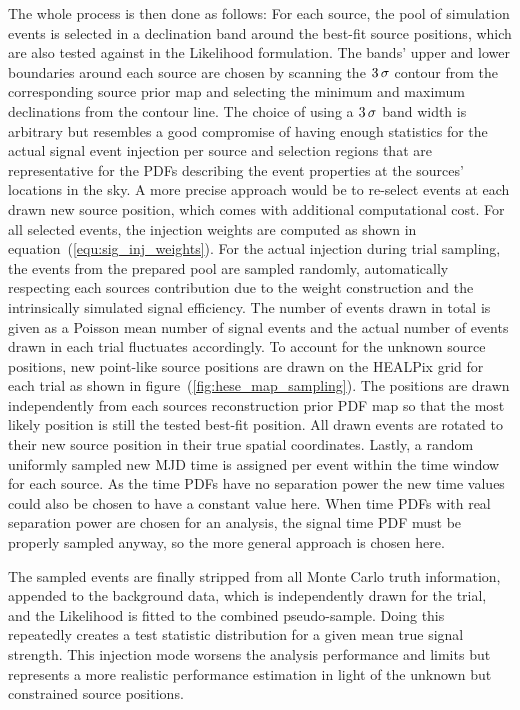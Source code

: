 The whole process is then done as follows:
For each source, the pool of simulation events is selected in a declination band around the best-fit source positions, which are also tested against in the Likelihood formulation.
The bands' upper and lower boundaries around each source are chosen by scanning the $\num{3}\,\sigma$ contour from the corresponding source prior map and selecting the minimum and maximum declinations from the contour line.
The choice of using a $\num{3}\,\sigma$ band width is arbitrary but resembles a good compromise of having enough statistics for the actual signal event injection per source and selection regions that are representative for the PDFs describing the event properties at the sources' locations in the sky.
A more precise approach would be to re-select events at each drawn new source position, which comes with additional computational cost.
For all selected events, the injection weights are computed as shown in equation~(\ref{equ:sig_inj_weights}).
For the actual injection during trial sampling, the events from the prepared pool are sampled randomly, automatically respecting each sources contribution due to the weight construction and the intrinsically simulated signal efficiency.
The number of events drawn in total is given as a Poisson mean number of signal events and the actual number of events drawn in each trial fluctuates accordingly.
To account for the unknown source positions, new point-like source positions are drawn on the HEALPix grid for each trial as shown in figure~(\ref{fig:hese_map_sampling}).
The positions are drawn independently from each sources reconstruction prior PDF map so that the most likely position is still the tested best-fit position.
All drawn events are rotated to their new source position in their true spatial coordinates.
Lastly, a random uniformly sampled new MJD time is assigned per event within the time window for each source.
As the time PDFs have no separation power the new time values could also be chosen to have a constant value here.
When time PDFs with real separation power are chosen for an analysis, the signal time PDF must be properly sampled anyway, so the more general approach is chosen here.

The sampled events are finally stripped from all Monte Carlo truth information, appended to the background data, which is independently drawn for the trial, and the Likelihood is fitted to the combined pseudo-sample.
Doing this repeatedly creates a test statistic distribution for a given mean true signal strength.
This injection mode worsens the analysis performance and limits but represents a more realistic performance estimation in light of the unknown but constrained source positions.

